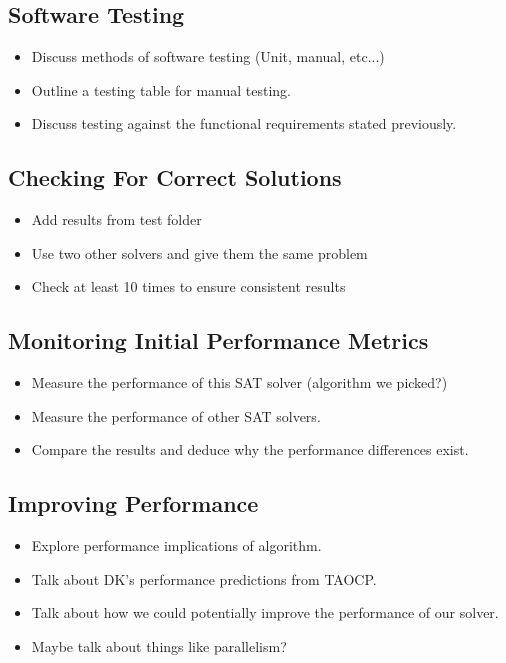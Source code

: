 \documentclass{article}
\begin{document}
\subsection{Software Testing}
\begin{itemize}
    \item Discuss methods of software testing (Unit, manual, etc...)
    \item Outline a testing table for manual testing.
    \item Discuss testing against the functional requirements stated previously.
\end{itemize}

\subsection{Checking For Correct Solutions}
\begin{itemize}
    \item Add results from test folder
    \item Use two other solvers and give them the same problem
    \item Check at least 10 times to ensure consistent results
\end{itemize}

\subsection{Monitoring Initial Performance Metrics}
\begin{itemize}
    \item Measure the performance of this SAT solver (algorithm we picked?)
    \item Measure the performance of other SAT solvers.
    \item Compare the results and deduce why the performance differences exist.
\end{itemize}

\subsection{Improving Performance}
\begin{itemize}
    \item Explore performance implications of algorithm.
    \item Talk about DK's performance predictions from TAOCP.
    \item Talk about how we could potentially improve the performance of our solver.
    \item Maybe talk about things like parallelism?
\end{itemize}
\end{document}

